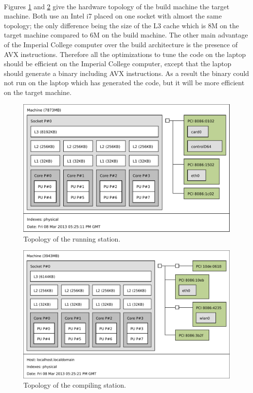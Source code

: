 \documentclass[fleqn,11pt]{SelfArx} %
\theoremstyle{definition}
\begin{document}
\paragraph{}

Figures \ref{topoR} and \ref{topoC} give the hardware topology of the build machine the target machine. Both use an Intel i7 placed on one socket with almost the same topology; the only difference being the size of the L3 cache which is 8M on the target machine compared to 6M on the build machine. The other main advantage of the Imperial College computer over the build architecture is the presence of AVX instructions. Therefore all the optimizations to tune the code on the laptop should be efficient on the Imperial College computer, except that the laptop should generate a binary including AVX instructions. As a result the binary could not run on the laptop which has generated the code, but it will be more efficient on the target machine.

\begin{figure}
	\centering

	\includegraphics[width=.48\textwidth]{picture/run.pdf}

	\caption{Topology of the running station.}
	\label{topoR}
\end{figure}

\begin{figure}
	\centering

	\includegraphics[width=.48\textwidth]{picture/compile.pdf}

	\caption{Topology of the compiling station.}
	\label{topoC}
\end{figure}


\FloatBarrier
\end{document}
